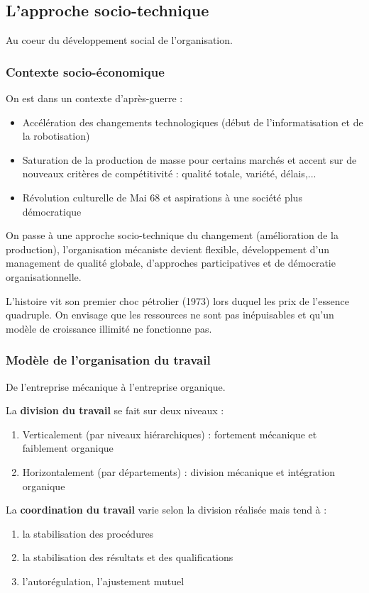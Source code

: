 \documentclass[12pt]{article}
\begin{document}
	\subsection{L'approche socio-technique}
	Au coeur du développement social de l'organisation.
	
	\subsubsection{Contexte socio-économique}
	
	On est dans un contexte d'après-guerre :
	
	\begin{itemize}
	 \item Accélération des changements technologiques (début de l'informatisation et de la robotisation)
	 \item Saturation de la production de masse pour certains marchés et accent sur de nouveaux critères de compétitivité : qualité totale, variété, délais,...
	 \item Révolution culturelle de Mai 68 et aspirations à une société plus démocratique
	\end{itemize}
	
	On passe à une approche socio-technique du changement (amélioration de la production), l'organisation mécaniste devient flexible, développement d'un management de qualité globale, d'approches participatives et de démocratie organisationnelle.
	
	L'histoire vit son premier choc pétrolier (1973) lors duquel les prix de l'essence quadruple. On envisage que les ressources ne sont pas inépuisables et qu'un modèle de croissance illimité ne fonctionne pas.
	
	\subsubsection{Modèle de l'organisation du travail}
	De l'entreprise mécanique à l'entreprise organique.
	
	La \textbf{division du travail} se fait sur deux niveaux :
	\begin{enumerate}
	 \item Verticalement (par niveaux hiérarchiques) : fortement mécanique et faiblement organique
	 \item Horizontalement (par départements) : division mécanique et intégration organique
	\end{enumerate}
	
	La \textbf{coordination du travail} varie selon la division réalisée mais tend à :
	\begin{enumerate}
	 \item la stabilisation des procédures
	 \item la stabilisation des résultats et des qualifications
	 \item l'autorégulation, l'ajustement mutuel
	\end{enumerate}
	
\end{document}
